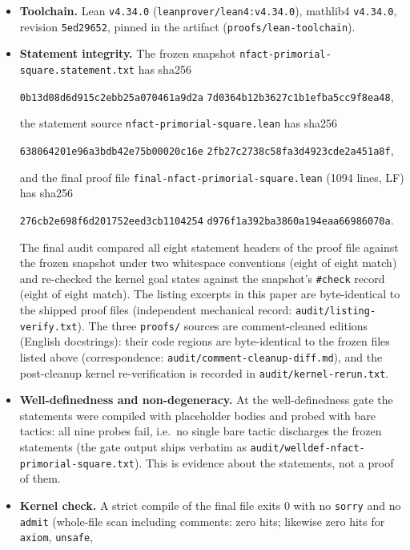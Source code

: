 \documentclass[11pt]{article}
\theoremstyle{definition}
\begin{document}
\begin{itemize}
\item \textbf{Toolchain.} Lean \texttt{v4.34.0}
(\texttt{leanprover/lean4:v4.34.0}), mathlib4 \texttt{v4.34.0}, revision
\texttt{5ed29652}, pinned in the artifact (\texttt{proofs/lean-toolchain}).
\item \textbf{Statement integrity.} The frozen snapshot
\texttt{nfact-primorial-square.statement.txt} has sha256
\begin{center}
\texttt{0b13d08d6d915c2ebb25a070461a9d2a}\allowbreak
\texttt{7d0364b12b3627c1b1efba5cc9f8ea48},
\end{center}
the statement source \texttt{nfact-primorial-square.lean} has sha256
\begin{center}
\texttt{638064201e96a3bdb42e75b00020c16e}\allowbreak
\texttt{2fb27c2738c58fa3d4923cde2a451a8f},
\end{center}
and the final proof file \texttt{final-nfact-primorial-square.lean}
(1094 lines, LF) has sha256
\begin{center}
\texttt{276cb2e698f6d201752eed3cb1104254}\allowbreak
\texttt{d976f1a392ba3860a194eaa66986070a}.
\end{center}
The final audit compared all eight statement headers of the proof file
against the frozen snapshot under two whitespace conventions (eight of eight
match) and re-checked the kernel goal states against the snapshot's
\texttt{\#check} record (eight of eight match). The listing excerpts in this
paper are byte-identical to the shipped proof files (independent mechanical
record: \texttt{audit/listing-verify.txt}). The three \texttt{proofs/} sources
are comment-cleaned editions (English docstrings): their code regions are
byte-identical to the frozen files listed above (correspondence:
\texttt{audit/comment-cleanup-diff.md}), and the post-cleanup kernel
re-verification is recorded in \texttt{audit/kernel-rerun.txt}.
\item \textbf{Well-definedness and non-degeneracy.} At the
well-definedness gate the statements were compiled with placeholder bodies
and probed with bare tactics: all nine probes fail, i.e.\ no single bare
tactic discharges the frozen statements (the gate output ships verbatim as
\texttt{audit/welldef-nfact-primorial-square.txt}). This is evidence about
the statements, not a proof of them.
\item \textbf{Kernel check.} A strict compile of the final file exits $0$
with no \texttt{sorry} and no \texttt{admit} (whole-file scan including
comments: zero hits; likewise zero hits for \texttt{axiom}, \texttt{unsafe},

\end{itemize}
\end{document}
